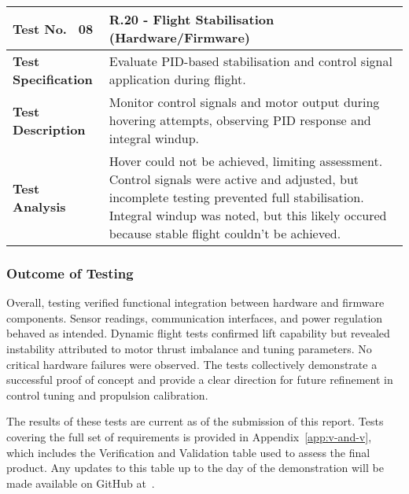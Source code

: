 \begin{table}[H]
\centering
\renewcommand{\arraystretch}{1.2}
\begin{tabular}{|p{3.5cm}|p{12cm}|}
\hline
\textbf{Test No. \, 08} & \textbf{R.20 - Flight Stabilisation} (Hardware/Firmware) \\ \hline
\textbf{Test Specification} & 
Evaluate PID-based stabilisation and control signal application during flight. \\ \hline
\textbf{Test Description} & 
Monitor control signals and motor output during hovering attempts, observing PID response and integral windup. \\ \hline
\textbf{Test Analysis} & 
Hover could not be achieved, limiting assessment. Control signals were active and adjusted, but incomplete testing prevented full stabilisation. Integral windup was noted, but this likely occured because stable flight couldn't be achieved. \\ \hline
\end{tabular}
\end{table}

\subsubsection{Outcome of Testing} \leavevmode

Overall, testing verified functional integration between hardware and firmware components. Sensor readings, communication interfaces, and power regulation behaved as intended. Dynamic flight tests confirmed lift capability but revealed instability attributed to motor thrust imbalance and tuning parameters. No critical hardware failures were observed. The tests collectively demonstrate a successful proof of concept and provide a clear direction for future refinement in control tuning and propulsion calibration.

The results of these tests are current as of the submission of this report. Tests covering the full set of requirements is provided in Appendix~\ref{app:v-and-v}, which includes the Verification and Validation table used to assess the final product. Any updates to this table up to the day of the demonstration will be made available on GitHub at~\cite{flightcontroller_git}.